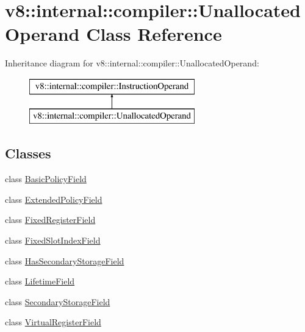 \hypertarget{classv8_1_1internal_1_1compiler_1_1_unallocated_operand}{}\section{v8\+:\+:internal\+:\+:compiler\+:\+:Unallocated\+Operand Class Reference}
\label{classv8_1_1internal_1_1compiler_1_1_unallocated_operand}
Inheritance diagram for v8\+:\+:internal\+:\+:compiler\+:\+:Unallocated\+Operand\+:\begin{figure}[H]
\begin{center}
\leavevmode
\includegraphics[height=2.000000cm]{classv8_1_1internal_1_1compiler_1_1_unallocated_operand}
\end{center}
\end{figure}
\subsection*{Classes}
\begin{DoxyCompactItemize}
\item 
class \hyperlink{classv8_1_1internal_1_1compiler_1_1_unallocated_operand_1_1_basic_policy_field}{Basic\+Policy\+Field}
\item 
class \hyperlink{classv8_1_1internal_1_1compiler_1_1_unallocated_operand_1_1_extended_policy_field}{Extended\+Policy\+Field}
\item 
class \hyperlink{classv8_1_1internal_1_1compiler_1_1_unallocated_operand_1_1_fixed_register_field}{Fixed\+Register\+Field}
\item 
class \hyperlink{classv8_1_1internal_1_1compiler_1_1_unallocated_operand_1_1_fixed_slot_index_field}{Fixed\+Slot\+Index\+Field}
\item 
class \hyperlink{classv8_1_1internal_1_1compiler_1_1_unallocated_operand_1_1_has_secondary_storage_field}{Has\+Secondary\+Storage\+Field}
\item 
class \hyperlink{classv8_1_1internal_1_1compiler_1_1_unallocated_operand_1_1_lifetime_field}{Lifetime\+Field}
\item 
class \hyperlink{classv8_1_1internal_1_1compiler_1_1_unallocated_operand_1_1_secondary_storage_field}{Secondary\+Storage\+Field}
\item 
class \hyperlink{classv8_1_1internal_1_1compiler_1_1_unallocated_operand_1_1_virtual_register_field}{Virtual\+Register\+Field}
\end{DoxyCompactItemize}
